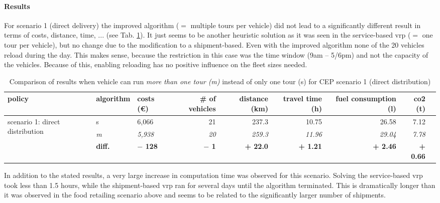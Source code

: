 \paragraph*{Results}
For scenario 1 (direct delivery) the improved algorithm ($=$ multiple tours per vehicle) did not lead to a significantly different result in terms of costs, distance, time, ... (see Tab. \ref{tab:CEP1SinglevsMultiToursData}). It just seems to be another heuristic solution as it was seen in the service-based \gls{vrp} ($=$ one tour per vehicle), but no change due to the modification to a shipment-based. Even with the improved algorithm none of the 20 vehicles reload during the day.
This makes sense, because the restriction in this case was the time window (9am -- 5/6pm) and not the capacity of the vehicles. Because of this, enabling reloading has no positive influence on the fleet sizes needed. 

\begin{table}[tb]
\caption{Comparison of results when vehicle can run \textit{more than one tour (m)} instead of only one tour (s) for CEP scenario 1 (direct distribution)}
\begin{tabular*}{\hsize}{@{\extracolsep{\fill}}lllrrrrrr@{}}
\toprule
policy & algorithm & costs (\euro)  & \# of vehicles & distance (km) & travel time (h) & fuel consumption (l) & \gls{co2}  (t)\\
\midrule
\multirow{ 3}{50pt}{scenario 1: direct distribution} & s  &  6,066  & 21 & 237.3 & 10.75 & 26.58 & 7.12 \\
& \textit{m}  & \textit{5,938} & \textit{20} & \textit{259.3} & \textit{11.96} & \textit{29.04} & \textit{7.78}\\ 
& \textbf{diff.} & \textbf{$-$ 128} & \textbf{$-$ 1} & \textbf{+ 22.0} & \textbf{+ 1.21} & \textbf{+ 2.46} & \textbf{+ 0.66}\\ 
\bottomrule
\end{tabular*}
\label{tab:CEP1SinglevsMultiToursData}
\end{table}

In addition to the stated results, a very large increase in computation time was observed for this scenario. Solving the service-based \gls{vrp} took less than 1.5 hours, while the shipment-based \gls{vrp} ran for several days until the algorithm terminated. This is dramatically longer than it was observed in the food retailing scenario above and seems to be related to the significantly larger number of shipments. 

